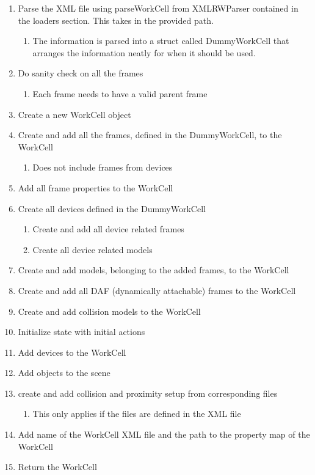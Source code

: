 \begin{enumerate}
	\item Parse the XML file using parseWorkCell from XMLRWParser contained in the loaders section. This takes in the provided path.
	\begin{enumerate}
		\item The information is parsed into a struct called DummyWorkCell that arranges the information neatly for when it should be used.
	\end{enumerate}
	\item Do sanity check on all the frames
	\begin{enumerate}
		\item Each frame needs to have a valid parent frame
	\end{enumerate}
	\item Create a new WorkCell object
	\item Create and add all the frames, defined in the DummyWorkCell, to the WorkCell
	\begin{enumerate}
		\item Does not include frames from devices
	\end{enumerate}
	\item Add all frame properties to the WorkCell
	\item Create all devices defined in the DummyWorkCell
	\begin{enumerate}
		\item Create and add all device related frames
		\item Create all device related models
	\end{enumerate}
	\item Create and add models, belonging to the added frames, to the WorkCell
	\item Create and add all DAF (dynamically attachable) frames to the WorkCell
	\item Create and add collision models to the WorkCell
	\item Initialize state with initial actions
	\item Add devices to the WorkCell
	\item Add objects to the scene
	\item create and add collision and proximity setup from corresponding files
	\begin{enumerate}
		\item This only applies if the files are defined in the XML file
	\end{enumerate}
	\item Add name of the WorkCell XML file and the path to the property map of the WorkCell
	\item Return the WorkCell
\end{enumerate}

